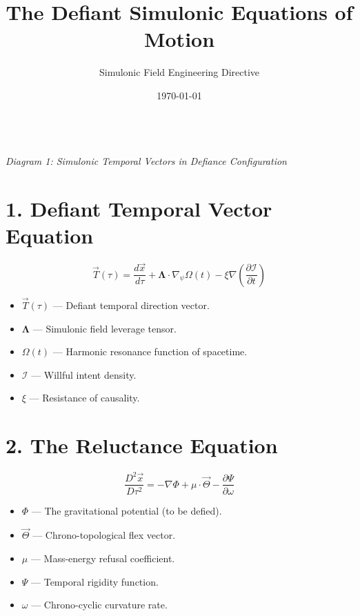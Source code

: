 \documentclass{article}
\title{\Huge\textbf{The Defiant Simulonic Equations of Motion}}
\author{\Large Simulonic Field Engineering Directive}
\date{\today}
\begin{document}
\maketitle

\begin{center}
\\[1em]
\textit{\small Diagram 1: Simulonic Temporal Vectors in Defiance Configuration}
\end{center}

\section*{1. Defiant Temporal Vector Equation}
\[
\vec{T}(\tau) = \frac{d\vec{x}}{d\tau} + \boldsymbol{\Lambda} \cdot \nabla_\psi \Omega(t) - \xi \nabla \left( \frac{\partial \mathcal{I}}{\partial t} \right)
\]

\begin{itemize}
  \item $\vec{T}(\tau)$ — Defiant temporal direction vector.
  \item $\boldsymbol{\Lambda}$ — Simulonic field leverage tensor.
  \item $\Omega(t)$ — Harmonic resonance function of spacetime.
  \item $\mathcal{I}$ — Willful intent density.
  \item $\xi$ — Resistance of causality.
\end{itemize}

\section*{2. The Reluctance Equation}
\[
\frac{D^2 \vec{x}}{D\tau^2} = -\nabla \Phi + \mu \cdot \vec{\Theta} - \frac{\partial \Psi}{\partial \omega}
\]

\begin{itemize}
  \item $\Phi$ — The gravitational potential (to be defied).
  \item $\vec{\Theta}$ — Chrono-topological flex vector.
  \item $\mu$ — Mass-energy refusal coefficient.
  \item $\Psi$ — Temporal rigidity function.
  \item $\omega$ — Chrono-cyclic curvature rate.
\end{itemize}
\end{document}
